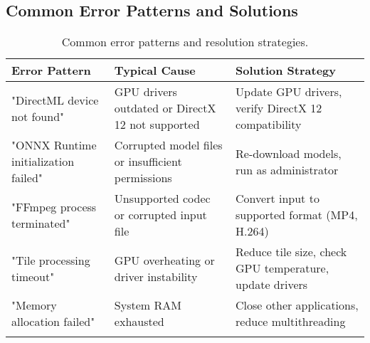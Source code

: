 \documentclass[11pt, a4paper]{article}
\begin{document}
\subsection{Common Error Patterns and Solutions}
\begin{longtable}{p{4cm} p{5cm} p{6cm}}
\toprule
\textbf{Error Pattern} & \textbf{Typical Cause} & \textbf{Solution Strategy} \\
\midrule
\endhead
"DirectML device not found" & GPU drivers outdated or DirectX 12 not supported & Update GPU drivers, verify DirectX 12 compatibility \\
"ONNX Runtime initialization failed" & Corrupted model files or insufficient permissions & Re-download models, run as administrator \\
"FFmpeg process terminated" & Unsupported codec or corrupted input file & Convert input to supported format (MP4, H.264) \\
"Tile processing timeout" & GPU overheating or driver instability & Reduce tile size, check GPU temperature, update drivers \\
"Memory allocation failed" & System RAM exhausted & Close other applications, reduce multithreading \\
\bottomrule
\caption{Common error patterns and resolution strategies.}
\end{longtable}


\end{document}
